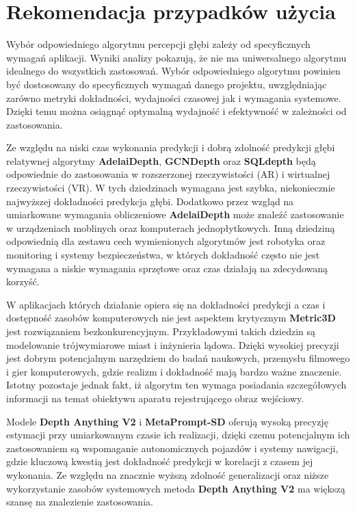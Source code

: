 \section{Rekomendacja przypadków użycia}
Wybór odpowiedniego algorytmu percepcji głębi zależy od specyficznych wymagań aplikacji. Wyniki analizy pokazują, że nie ma uniwersalnego algorytmu idealnego do wszystkich zastosowań. Wybór odpowiedniego algorytmu powinien być dostosowany do specyficznych wymagań danego projektu, uwzględniając zarówno metryki dokładności, wydajności czasowej jak i wymagania systemowe. Dzięki temu można osiągnąć optymalną wydajność i efektywność w zależności od zastosowania.

Ze względu na niski czas wykonania predykcji i dobrą zdolność predykcji głębi relatywnej algorytmy \textbf{AdelaiDepth}, \textbf{GCNDepth} oraz \textbf{SQLdepth} będą odpowiednie do zastosowania w rozszerzonej rzeczywistości (AR) i wirtualnej rzeczywistości (VR). W tych dziedzinach wymagana jest szybka, niekoniecznie najwyższej dokładności predykcja głębi. Dodatkowo przez wzgląd na umiarkowane wymagania obliczeniowe \textbf{AdelaiDepth} może znaleźć zastosowanie w urządzeniach moblinych oraz komputerach jednopłytkowych. Inną dziedziną odpowiednią dla zestawu cech wymienionych algorytmów jest robotyka oraz monitoring i systemy bezpieczeństwa, w których dokładność często nie jest wymagana a niskie wymagania sprzętowe oraz czas działają na zdecydowaną korzyść.

W aplikacjach których działanie opiera się na dokładności predykcji a czas i dostępność zasobów komputerowych nie jest aspektem krytycznym \textbf{Metric3D} jest rozwiązaniem bezkonkurencyjnym. Przykładowymi takich dziedzin są modelowanie trójwymiarowe miast i inżynieria lądowa. Dzięki wysokiej precyzji jest dobrym potencjalnym narzędziem do badań naukowych, przemysłu filmowego i gier komputerowych, gdzie realizm i dokładność mają bardzo ważne znaczenie. Istotny pozostaje jednak fakt, iż algorytm ten wymaga posiadania szczegółowych informacji na temat obiektywu aparatu rejestrującego obraz wejściowy.

Modele \textbf{Depth Anything V2} i \textbf{MetaPrompt-SD} oferują wysoką precyzję estymacji przy umiarkowanym czasie ich realizacji, dzięki czemu potencjalnym ich zastosowaniem są wspomaganie autonomicznych pojazdów i systemy nawigacji, gdzie kluczową kwestią jest dokładność predykcji w korelacji z czasem jej wykonania. Ze względu na znacznie wyższą zdolność generalizacji oraz niższe wykorzystanie zasobów systemowych metoda \textbf{Depth Anything V2} ma większą szansę na znalezienie zastosowania.